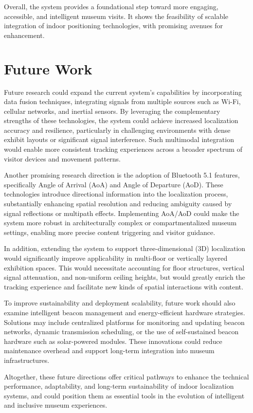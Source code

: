 Overall, the system provides a foundational step toward more engaging, accessible, and intelligent museum visits. It shows the feasibility of scalable integration of indoor positioning technologies, with promising avenues for enhancement.

\section{Future Work}

Future research could expand the current system’s capabilities by incorporating data fusion techniques, integrating signals from multiple sources such as Wi-Fi, cellular networks, and inertial sensors. By leveraging the complementary strengths of these technologies, the system could achieve increased localization accuracy and resilience, particularly in challenging environments with dense exhibit layouts or significant signal interference. Such multimodal integration would enable more consistent tracking experiences across a broader spectrum of visitor devices and movement patterns. 

Another promising research direction is the adoption of Bluetooth 5.1 features, specifically Angle of Arrival (AoA) and Angle of Departure (AoD). These technologies introduce directional information into the localization process, substantially enhancing spatial resolution and reducing ambiguity caused by signal reflections or multipath effects. Implementing AoA/AoD could make the system more robust in architecturally complex or compartmentalized museum settings, enabling more precise content triggering and visitor guidance. 

In addition, extending the system to support three-dimensional (3D) localization would significantly improve applicability in multi-floor or vertically layered exhibition spaces. This would necessitate accounting for floor structures, vertical signal attenuation, and non-uniform ceiling heights, but would greatly enrich the tracking experience and facilitate new kinds of spatial interactions with content. 

To improve sustainability and deployment scalability, future work should also examine intelligent beacon management and energy-efficient hardware strategies. Solutions may include centralized platforms for monitoring and updating beacon networks, dynamic transmission scheduling, or the use of self-sustained beacon hardware such as solar-powered modules. These innovations could reduce maintenance overhead and support long-term integration into museum infrastructures. 

Altogether, these future directions offer critical pathways to enhance the technical performance, adaptability, and long-term sustainability of indoor localization systems, and could position them as essential tools in the evolution of intelligent and inclusive museum experiences.
